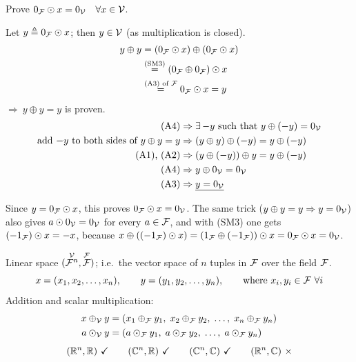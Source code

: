 \begin{example}
Prove $0_{\mathcal{F}}\odot x = 0_{\mathcal{V}} \quad \forall x\in\mathcal{V}$.

Let $y \triangleq 0_{\mathcal{F}}\odot x$; then $y\in\mathcal{V}$ (as multiplication is closed).
\begin{align*}
y\oplus y &= (0_{\mathcal{F}}\odot x)\oplus(0_{\mathcal{F}}\odot x)\\
&\overset{\text{(SM3)}}{=} (0_{\mathcal{F}}\oplus0_{\mathcal{F}})\odot x\\
&\overset{\text{(A3) of }\mathcal{F}}{=} 0_{\mathcal{F}}\odot x = y
\end{align*}
$\Rightarrow\ y\oplus y = y$ is proven.
\begin{align*}
\text{(A4)} &\Rightarrow \exists\, {-y} \text{ such that } y\oplus(-y) = 0_{\mathcal{V}}\\
\text{add $-y$ to both sides of } y\oplus y=y &\Rightarrow (y\oplus y)\oplus(-y) = y\oplus(-y)\\
\text{(A1), (A2)} &\Rightarrow (y\oplus(-y))\oplus y = y\oplus(-y)\\
\text{(A4)} &\Rightarrow y\oplus 0_{\mathcal{V}} = 0_{\mathcal{V}}\\
\text{(A3)} &\Rightarrow \underline{y = 0_{\mathcal{V}}}
\end{align*}
\begin{insight}
Since $y=0_{\mathcal{F}}\odot x$, this proves $0_{\mathcal{F}}\odot x=0_{\mathcal{V}}$. The same trick ($y\oplus y=y\Rightarrow y=0_{\mathcal{V}}$) also gives $a\odot 0_{\mathcal{V}}=0_{\mathcal{V}}$ for every $a\in\mathcal{F}$, and with (SM3) one gets $(-1_{\mathcal{F}})\odot x = -x$, because $x\oplus((-1_{\mathcal{F}})\odot x) = (1_{\mathcal{F}}\oplus(-1_{\mathcal{F}}))\odot x = 0_{\mathcal{F}}\odot x = 0_{\mathcal{V}}$.
\end{insight}
\end{example}

\begin{example}
Linear space $(\overset{\mathcal{V}}{\mathcal{F}^n},\overset{\mathcal{F}}{\mathcal{F}})$; i.e.\ the vector space of $n$ tuples in $\mathcal{F}$ over the field $\mathcal{F}$.
\[
x = (x_1,x_2,\dots,x_n), \qquad y = (y_1,y_2,\dots,y_n), \qquad \text{where } x_i,y_i\in\mathcal{F}\ \forall i
\]
Addition and scalar multiplication:
\begin{align*}
x\oplus_{\mathcal{V}} y &= (x_1\oplus_{\mathcal{F}} y_1,\; x_2\oplus_{\mathcal{F}} y_2,\;\dots,\; x_n\oplus_{\mathcal{F}} y_n)\\
a\odot_{\mathcal{V}} y &= (a\odot_{\mathcal{F}} y_1,\; a\odot_{\mathcal{F}} y_2,\;\dots,\; a\odot_{\mathcal{F}} y_n)
\end{align*}
\[
(\R^n,\R)\ \checkmark \qquad (\C^n,\R)\ \checkmark \qquad (\C^n,\C)\ \checkmark \qquad (\R^n,\C)\ \times
\]
\end{example}

